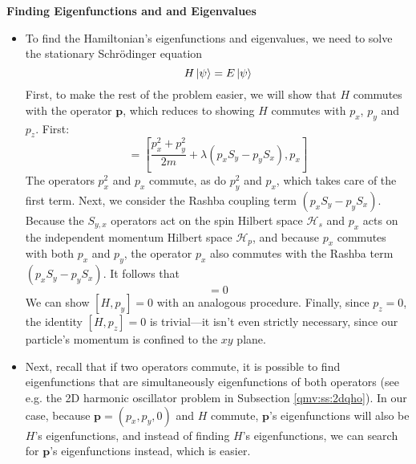 \documentclass[11pt, a4paper]{article}
\newcommand{\Schro}{Schr\"{o}dinger\xspace}
\renewcommand{\vec}[1]{\bm{#1}} %
\renewcommand{\H}{\mathcal{H}}  %
\begin{document}
\textbf{Finding Eigenfunctions and and Eigenvalues}
\begin{itemize}
	
	\item To find the Hamiltonian's eigenfunctions and eigenvalues, we need to solve the stationary \Schro equation
	\begin{equation*}
		H \ket{\psi} = E \ket{\psi}
	\end{equation*}
	First, to make the rest of the problem easier, we will show that $ H $ commutes with the operator $ \vec{p} $, which reduces to showing $ H $ commutes with $ p_{x}$, $ p_{y} $ and $ p_{z} $. First:
	\begin{equation*}
		[H, p_{x}] = \left[\frac{p_{x}^{2} + p_{y}^{2}}{2m} + \lambda (p_{x}S_{y} - p_{y}S_{x}), p_{x}\right]
	\end{equation*}
	The operators $ p_{x}^{2} $ and $ p_{x} $ commute, as do $ p_{y}^{2} $ and $ p_{x} $, which takes care of the first term. Next, we consider the Rashba coupling term $ (p_{x}S_{y} - p_{y}S_{x}) $. Because the $ S_{y, x} $ operators act on the spin Hilbert space $ \H_{s} $ and $ p_{x} $ acts on the independent momentum Hilbert space $ \H_{p} $, and because $ p_{x} $ commutes with both $ p_{x} $ and $ p_{y}$, the operator $ p_{x} $ also commutes with the Rashba term $ (p_{x}S_{y} - p_{y}S_{x}) $. It follows that
	\begin{equation*}
		[H, p_{x}] = 0
	\end{equation*}
	We can show $ [H, p_{y}] = 0 $ with an analogous procedure. Finally, since $ p_{z} = 0 $, the identity $ [H, p_{z}] = 0 $ is trivial---it isn't even strictly necessary, since our particle's momentum is confined to the $ xy $ plane.
	
	\item Next, recall that if two operators commute, it is possible to find eigenfunctions that are simultaneously eigenfunctions of both operators (see e.g. the 2D harmonic oscillator problem in Subsection \ref{qmv:ss:2dqho}). In our case, because $ \vec{p} = (p_{x}, p_{y}, 0)$ and $ H $ commute, $ \vec{p} $'s eigenfunctions will also be $ H $'s eigenfunctions, and instead of finding $ H $'s eigenfunctions, we can search for $ \vec{p} $'s eigenfunctions instead, which is easier.
	

\end{itemize}
\end{document}
